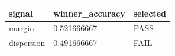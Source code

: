 \begin{tabular}{lll}
\toprule
signal & winner\_accuracy & selected \\
\midrule
margin & 0.521666667 & PASS \\
dispersion & 0.491666667 & FAIL \\
\bottomrule
\end{tabular}
